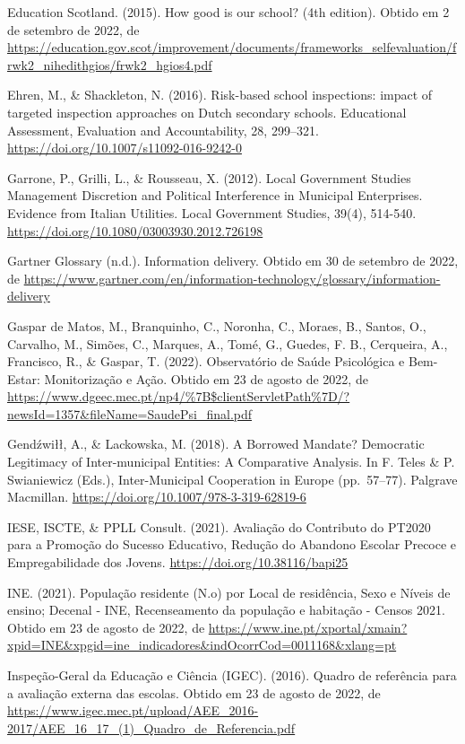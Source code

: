 \documentclass[
]{book}
\begin{document}
Education Scotland. (2015). How good is our school? (4th edition). Obtido em 2 de setembro de 2022, de \url{https://education.gov.scot/improvement/documents/frameworks_selfevaluation/frwk2_nihedithgios/frwk2_hgios4.pdf}

Ehren, M., \& Shackleton, N. (2016). Risk-based school inspections: impact of targeted inspection approaches on Dutch secondary schools. Educational Assessment, Evaluation and Accountability, 28, 299--321. \url{https://doi.org/10.1007/s11092-016-9242-0}

Garrone, P., Grilli, L., \& Rousseau, X. (2012). Local Government Studies Management Discretion and Political Interference in Municipal Enterprises. Evidence from Italian Utilities. Local Government Studies, 39(4), 514-540. \url{https://doi.org/10.1080/03003930.2012.726198}

Gartner Glossary (n.d.). Information delivery. Obtido em 30 de setembro de 2022, de \url{https://www.gartner.com/en/information-technology/glossary/information-delivery}

Gaspar de Matos, M., Branquinho, C., Noronha, C., Moraes, B., Santos, O., Carvalho, M., Simões, C., Marques, A., Tomé, G., Guedes, F. B., Cerqueira, A., Francisco, R., \& Gaspar, T. (2022). Observatório de Saúde Psicológica e Bem-Estar: Monitorização e Ação. Obtido em 23 de agosto de 2022, de \url{https://www.dgeec.mec.pt/np4/\%7B$clientServletPath\%7D/?newsId=1357\&fileName=SaudePsi_final.pdf}

Gendźwiłł, A., \& Lackowska, M. (2018). A Borrowed Mandate? Democratic Legitimacy of Inter-municipal Entities: A Comparative Analysis. In F. Teles \& P. Swianiewicz (Eds.), Inter-Municipal Cooperation in Europe (pp.~57--77). Palgrave Macmillan. \url{https://doi.org/10.1007/978-3-319-62819-6}

IESE, ISCTE, \& PPLL Consult. (2021). Avaliação do Contributo do PT2020 para a Promoção do Sucesso Educativo, Redução do Abandono Escolar Precoce e Empregabilidade dos Jovens. \url{https://doi.org/10.38116/bapi25}

INE. (2021). População residente (N.o) por Local de residência, Sexo e Níveis de ensino; Decenal - INE, Recenseamento da população e habitação - Censos 2021. Obtido em 23 de agosto de 2022, de \url{https://www.ine.pt/xportal/xmain?xpid=INE\&xpgid=ine_indicadores\&indOcorrCod=0011168\&xlang=pt}

Inspeção-Geral da Educação e Ciência (IGEC). (2016). Quadro de referência para a avaliação externa das escolas. Obtido em 23 de agosto de 2022, de \url{https://www.igec.mec.pt/upload/AEE_2016-2017/AEE_16_17_(1)_Quadro_de_Referencia.pdf}
\end{document}
